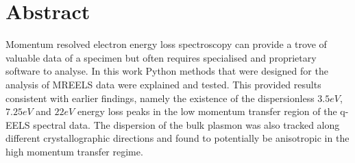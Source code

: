 \section*{Abstract}
%
Momentum resolved electron energy loss spectroscopy can provide a trove of valuable data of a specimen but often requires specialised and proprietary software to analyse. In this work Python methods that were designed for the analysis of MREELS data were explained and tested. This provided results consistent with earlier findings, namely the existence of the dispersionless $3.5eV$, $7.25eV$ and $22eV$ energy loss peaks in the low momentum transfer region of the q-EELS spectral data. The dispersion of the bulk plasmon was also tracked along different crystallographic directions and found to potentially be anisotropic in the high momentum transfer regime.